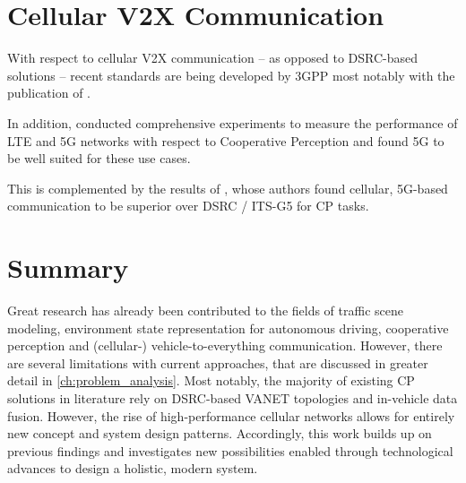 \section{Cellular V2X Communication}
\label{sec:related_work:cellular_v2x_communication}
With respect to cellular V2X communication – as opposed to DSRC-based solutions – recent standards are being developed by 3GPP most notably with the publication of \cite{3GPP2019}.

In addition, \cite{QualcommTechnologiesInc.2018} conducted comprehensive experiments to measure the performance of LTE and 5G networks with respect to Cooperative Perception and found 5G to be well suited for these use cases. 

This is complemented by the results of \cite{5GAutomotiveAssociation2016}, whose authors found cellular, 5G-based communication to be superior over DSRC / ITS-G5 for CP tasks.

\section{Summary}
\label{sec:related_work:summary}
Great research has already been contributed to the fields of traffic scene modeling, environment state representation for autonomous driving, cooperative perception and (cellular-) vehicle-to-everything communication. However, there are several limitations with current approaches, that are discussed in greater detail in \autoref{ch:problem_analysis}. Most notably, the majority of existing CP solutions in literature rely on DSRC-based VANET topologies and in-vehicle data fusion. However, the rise of high-performance cellular networks allows for entirely new concept and system design patterns. Accordingly, this work builds up on previous findings and investigates new possibilities enabled through technological advances to design a holistic, modern system. 